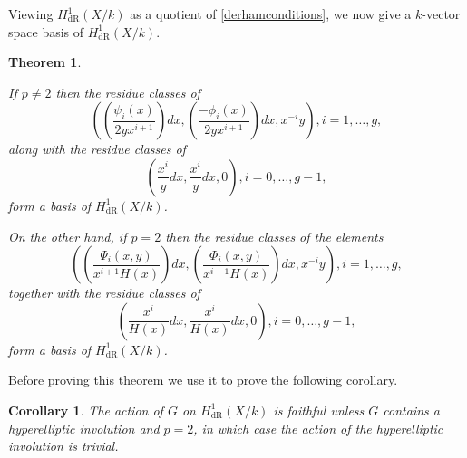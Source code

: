 \documentclass[draft, 11pt]{article} %
\theoremstyle{plain}
\newtheorem{thm}[defn]{Theorem}
\newtheorem{cor}[defn]{Corollary}
\theoremstyle{remark}
\newcommand{\derhamhone}{H_{\text {dR}}^1(X/k)}
\begin{document}
Viewing $\derhamhone$ as a quotient of \eqref{derhamconditions}, we now give a $k$-vector space basis of $\derhamhone$.
\begin{thm}\label{basis}

If $p \neq 2$ then the residue classes of 
\begin{equation}\label{one}
 \left( \left( \frac{\psi_i(x)}{2yx^{i+1}}\right) dx, \left(\frac{-\phi_i(x)}{2yx^{i+1}}\right) dx, x^{-i}y\right), i=1, \ldots ,g,
\end{equation}
along with the residue classes of 
\begin{equation}\label{two}
 \left( \frac{x^{i}}{y} dx , \frac{x^{i}}{y} dx, 0 \right), i = 0,\ldots ,g-1,
\end{equation}
form a basis of $\derhamhone$.

On the other hand, if $p=2$ then the residue classes of the elements 
\begin{equation}\label{three}
\left( \left(\frac{\Psi_i(x,y)}{x^{i+1}H(x)}\right) dx, \left( \frac{\Phi_i(x,y)}{x^{i+1}H(x)} \right) dx, x^{-i}y \right), i =1, \ldots , g,
\end{equation}
together with the residue classes of 
\begin{equation}\label{four}
\left( \frac{x^{i}}{H(x)} dx, \frac{x^{i}}{H(x)} dx, 0 \right), i=0, \ldots, g-1,
\end{equation}
form a basis of $\derhamhone$.
\end{thm}

Before proving this theorem we use it to prove the following corollary.

\begin{cor}
The action of $G$ on $\derhamhone$ is faithful unless $G$ contains a hyperelliptic involution and $p=2$, in which case the action of the hyperelliptic involution is trivial.
\end{cor}
\end{document}
